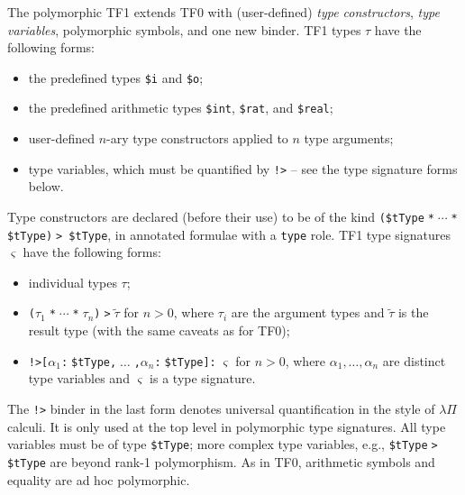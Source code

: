 \documentclass{easychair}
\begin{document}
The polymorphic TF1 extends TF0 with (user-defined) {\em type constructors}, 
{\em type variables}, polymorphic symbols, and one new binder.
TF1 types $\tau$ have the following forms:
\begin{itemize}
\item the predefined types {\tt \$i} and {\tt \$o};
\item the predefined arithmetic types {\tt \$int}, {\tt \$rat}, and 
      {\tt \$real};
\item user-defined $n$-ary type constructors applied to $n$ type arguments;
\item type variables, which must be quantified by {\tt !>} -- see the type
      signature forms below.
\end{itemize}
Type constructors are declared (before their use) to be of the kind
{\tt (\$tType$\;$*$\;{\cdots}\;$*$\;$\$tType)$\;$> \$tType}, in annotated 
formulae with a {\tt type} role.
TF1 type signatures $\varsigma$ have the following forms:
\begin{itemize}
\item individual types $\tau$;
\item {\tt ($\tau_1\;$*$\;{\cdots}\;$*$\;\tau_n$)$\;$>$\;\tilde \tau$}
      for $n > 0$, where $\tau_i$ are the argument types and $\tilde \tau$
      is the result type (with the same caveats as for TF0);
\item {\tt !>[$\alpha_1$:$\;$\$tType,$\;{\dots}\;$,$\alpha_n$:$\;$\$tType]:$\;\varsigma$}
      for $n > 0$, where $\alpha_1,\dots,\alpha_n$ are distinct
      type variables and $\varsigma$ is a type signature.
\end{itemize}
The {\tt !>} binder in the last form denotes universal quantification in the
style of $\lambda\Pi$ calculi.
It is only used at the top level in polymorphic type signatures.
All type variables must be of type {\tt \$tType}; more complex type variables,
e.g., {\tt \$tType$\;$>$\;$\$tType} are beyond rank-1 polymorphism.
As in TF0, arithmetic symbols and equality are ad hoc polymorphic.
\end{document}

